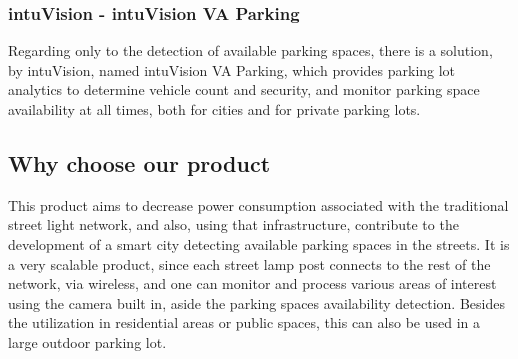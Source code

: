 \subsubsection{intuVision - intuVision VA Parking}
Regarding only to the detection of available parking spaces, there is a solution, by intuVision, named intuVision VA Parking, which provides parking lot analytics to determine vehicle count and security, and monitor parking space availability at all times, both for cities and for private parking lots. \cite{parking}


\subsection{Why choose our product}

This product aims to decrease power consumption associated with the traditional street light network, and also, using that infrastructure, contribute to the development of a smart city detecting available parking spaces in the streets. It is a very scalable product, since each street lamp post connects to the rest of the network, via wireless, and one can monitor and process various areas of interest using the camera built in, aside the parking spaces availability detection. Besides the utilization in residential areas or public spaces, this can also be used in a large outdoor parking lot.